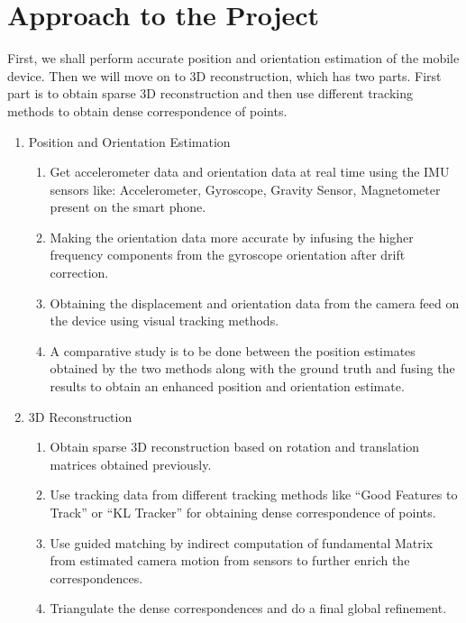 \documentclass{article}
\begin{document}
	\section{Approach to the Project} First, we shall perform accurate position and orientation estimation of the mobile device. Then we will move on to 3D reconstruction, which has two parts. First part is to obtain sparse 3D reconstruction and then use different tracking methods to obtain dense correspondence of points.
		\begin{enumerate}
			\item Position and Orientation Estimation
			\begin{enumerate}
				\item
					Get accelerometer data and orientation data at real time using the IMU sensors like: Accelerometer, Gyroscope, Gravity Sensor, Magnetometer present on the smart phone.
				\item
					Making the orientation data more accurate by infusing the higher frequency components from the gyroscope orientation after drift correction.
				\item
					Obtaining the displacement and orientation data from the camera feed on the device using visual tracking methods.
				\item
					A comparative study is to be done between the position estimates obtained by the two methods along with the ground truth and fusing the results to obtain an enhanced position and orientation estimate.
			\end{enumerate}
			\item 3D Reconstruction
			\begin{enumerate}
				\item 
					Obtain sparse 3D reconstruction based on rotation and translation matrices obtained previously.
				\item
					Use tracking data from different tracking methods like ``Good Features to Track'' or ``KL Tracker'' for obtaining dense correspondence of points.
				\item
					Use guided matching by indirect computation of fundamental Matrix from estimated camera motion from sensors to further enrich the correspondences.
				\item
					Triangulate the dense correspondences and do a final global refinement.					

\end{enumerate}
\end{enumerate}
\end{document}
